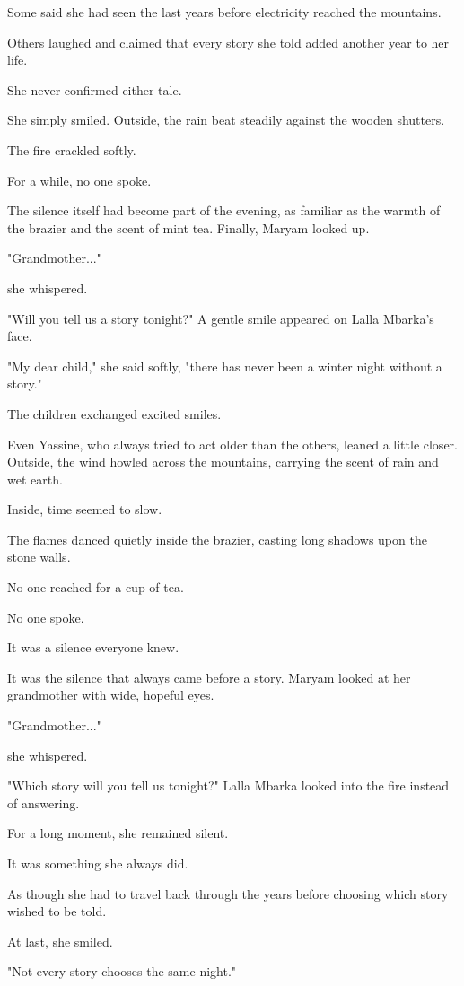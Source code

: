 \documentclass[12pt,openany]{book}
\begin{document}
Some said she had seen the last years before electricity reached the mountains.

Others laughed and claimed that every story she told added another year to her life.

She never confirmed either tale.

She simply smiled.
Outside, the rain beat steadily against the wooden shutters.

The fire crackled softly.

For a while, no one spoke.

The silence itself had become part of the evening, as familiar as the warmth of the brazier and the scent of mint tea.
Finally, Maryam looked up.

"Grandmother..."

she whispered.

"Will you tell us a story tonight?"
A gentle smile appeared on Lalla Mbarka's face.

"My dear child," she said softly, "there has never been a winter night without a story."

The children exchanged excited smiles.

Even Yassine, who always tried to act older than the others, leaned a little closer.
Outside, the wind howled across the mountains, carrying the scent of rain and wet earth.

Inside, time seemed to slow.

The flames danced quietly inside the brazier, casting long shadows upon the stone walls.

No one reached for a cup of tea.

No one spoke.

It was a silence everyone knew.

It was the silence that always came before a story.
Maryam looked at her grandmother with wide, hopeful eyes.

"Grandmother..."

she whispered.

"Which story will you tell us tonight?"
Lalla Mbarka looked into the fire instead of answering.

For a long moment, she remained silent.

It was something she always did.

As though she had to travel back through the years before choosing which story wished to be told.

At last, she smiled.

"Not every story chooses the same night."
\end{document}
